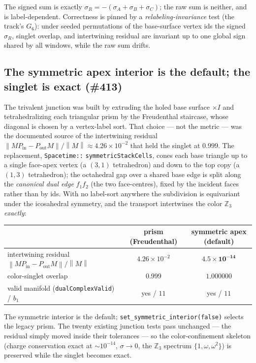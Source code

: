 \documentclass[11pt]{article}
\theoremstyle{definition}
\newcommand{\Z}{\mathbb{Z}}
\newcommand{\norm}[1]{\left\lVert #1 \right\rVert}
\newcommand{\sigmacol}{\sigma}
\newcommand{\Pin}{P_{\mathrm{in}}}
\newcommand{\Pout}{P_{\mathrm{out}}}
\newcommand{\code}[1]{\texttt{#1}}
\begin{document}
\noindent The signed sum is exactly $\sigmacol_R=-(\sigmacol_A+\sigmacol_B+\sigmacol_C)$;
the raw sum is neither, and is label-dependent. Correctness is pinned by a
\emph{relabeling-invariance} test (the track's $G_6$): under seeded permutations of the
base-surface vertex ids the signed $\sigmacol_R$, singlet overlap, and intertwining
residual are invariant up to one global sign shared by all windows, while the raw sum
drifts.

\subsection{The symmetric apex interior is the default; the singlet is exact (\#413)}
\label{sec:apex}

The trivalent junction was built by extruding the holed base surface $\times I$ and
tetrahedralizing each triangular prism by the Freudenthal staircase, whose diagonal is
chosen by a vertex-label sort. That choice --- not the metric --- was the documented
source of the intertwining residual $\norm{M\Pin-\Pout M}/\norm{M}\approx 4.26\times
10^{-2}$ that held the singlet at $0.999$. The replacement, \code{Spacetime::}\allowbreak
\code{symmetricStackCells}, cones each base triangle up to a single face-apex vertex (a
$(3,1)$ tetrahedron) and down to the top copy (a $(1,3)$ tetrahedron); the octahedral gap
over a shared base edge is split along the \emph{canonical dual edge} $f_1f_2$ (the two
face-centres), fixed by the incident faces rather than by ids. With no label-sort anywhere
the subdivision is equivariant under the icosahedral symmetry, and the transport
intertwines the color $\Z_3$ \emph{exactly}:

\begin{center}
\small
\begin{tabular}{@{}lcc@{}}
\toprule
 & prism (Freudenthal) & \textbf{symmetric apex (default)}\\
\midrule
intertwining residual $\norm{M\Pin-\Pout M}/\norm{M}$ & $4.26\times10^{-2}$ & $\mathbf{4.5\times10^{-14}}$\\
color-singlet overlap & $0.999$ & $\mathbf{1.000000}$\\
valid manifold (\code{dualComplexValid}) / $b_1$ & yes / $11$ & yes / $11$\\
\bottomrule
\end{tabular}
\end{center}

\noindent The symmetric interior is the default; \code{set\_symmetric\_interior(false)}
selects the legacy prism. The twenty existing junction tests pass unchanged --- the
residual simply moved inside their tolerances --- so the color-confinement skeleton
(charge conservation exact at $\sim10^{-14}$, $\sigmacol\to0$, the $\Z_3$ spectrum
$\{1,\omega,\omega^2\}$) is preserved while the singlet becomes exact.
\end{document}

